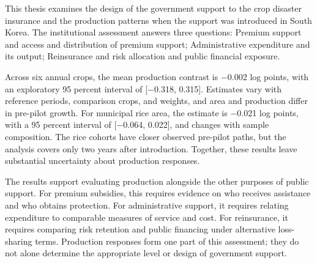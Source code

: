 
This thesis examines the design of the government support to the crop disaster insurance and the production patterns when the support was introduced in South Korea. The institutional assessment answers three questions: Premium support and access and distribution of premium support; Administrative expenditure and its output; Reinsurance and risk allocation and public financial exposure.

Across six annual crops, the mean production contrast is −0.002 log points, with an exploratory 95 percent interval of [−0.318, 0.315]. Estimates vary with reference periods, comparison crops, and weights, and area and production differ in pre-pilot growth. For municipal rice area, the estimate is −0.021 log points, with a 95 percent interval of [−0.064, 0.022], and changes with sample composition. The rice cohorts have closer observed pre-pilot paths, but the analysis covers only two years after introduction. Together, these results leave substantial uncertainty about production responses.

The results support evaluating production alongside the other purposes of public support. For premium subsidies, this requires evidence on who receives assistance and who obtains protection. For administrative support, it requires relating expenditure to comparable measures of service and cost. For reinsurance, it requires comparing risk retention and public financing under alternative loss-sharing terms. Production responses form one part of this assessment; they do not alone determine the appropriate level or design of government support.

